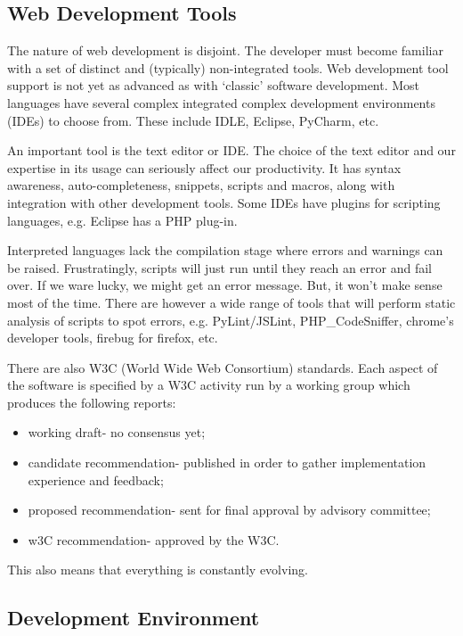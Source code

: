 \documentclass[a4paper, openany]{memoir}
\begin{document}
    \subsection{Web Development Tools}
    The nature of web development is disjoint. The developer must become familiar with a set of distinct and (typically) non-integrated tools. Web development tool support is not yet as advanced as with `classic' software development. Most languages have several complex integrated complex development environments (IDEs) to choose from. These include IDLE, Eclipse, PyCharm, etc.

    \noindent An important tool is the text editor or IDE. The choice of the text editor and our expertise in its usage can seriously affect our productivity. It has syntax awareness, auto-completeness, snippets, scripts and macros, along with integration with other development tools. Some IDEs have plugins for scripting languages, e.g. Eclipse has a PHP plug-in.

    \noindent Interpreted languages lack the compilation stage where errors and warnings can be raised. Frustratingly, scripts will just run until they reach an error and fail over. If we ware lucky, we might get an error message. But, it won't make sense most of the time. There are however a wide range of tools that will perform static analysis of scripts to spot errors, e.g. PyLint/JSLint, PHP\_CodeSniffer, chrome's developer tools, firebug for firefox, etc.

    \noindent There are also W3C (World Wide Web Consortium) standards. Each aspect of the software is specified by a W3C activity run by a working group which produces the following reports:
    \begin{itemize}
        \item working draft- no consensus yet;
        \item candidate recommendation- published in order to gather implementation experience and feedback;
        \item proposed recommendation- sent for final approval by advisory committee;
        \item w3C recommendation- approved by the W3C.
    \end{itemize}
    This also means that everything is constantly evolving.

    \subsection{Development Environment}
\end{document}
